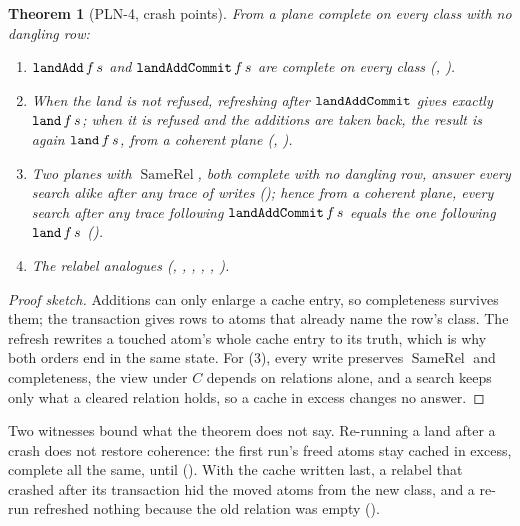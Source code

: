 \documentclass[11pt]{article}
\theoremstyle{plain}
\newtheorem{theorem}{Theorem}[section]
\theoremstyle{definition}
\theoremstyle{remark}
\newcommand{\mlean}[1]{\text{\texttt{#1}}}
\begin{document}
\begin{theorem}[PLN-4, crash points]\label{thm:crash}
From a plane complete on every class with no dangling row:
\begin{enumerate}
  \item $\mlean{landAdd}\,f\,s$ and $\mlean{landAddCommit}\,f\,s$ are complete on every class
  (, ).
  \item When the land is not refused, refreshing after $\mlean{landAddCommit}$ gives exactly
  $\mlean{land}\,f\,s$; when it is refused and the additions are taken back, the result is again
  $\mlean{land}\,f\,s$, from a coherent plane (,
  ).
  \item Two planes with $\operatorname{SameRel}$, both complete with no dangling row, answer
  every search alike after any trace of writes (); hence from a
  coherent plane, every search after any trace following $\mlean{landAddCommit}\,f\,s$ equals
  the one following $\mlean{land}\,f\,s$ ().
  \item The relabel analogues (, ,
  , ,
  , ).
\end{enumerate}
\end{theorem}

\begin{proof}[Proof sketch]
Additions can only enlarge a cache entry, so completeness survives them; the transaction gives
rows to atoms that already name the row's class. The refresh rewrites a touched atom's whole
cache entry to its truth, which is why both orders end in the same state. For (3), every write
preserves $\operatorname{SameRel}$ and completeness, the view under $C$ depends on relations
alone, and a search keeps only what a cleared relation holds, so a cache in excess changes no
answer.
\end{proof}

Two witnesses bound what the theorem does not say. Re-running a land after a crash does not
restore coherence: the first run's freed atoms stay cached in excess, complete all the same, until
 (). With the cache written last, a
relabel that crashed after its transaction hid the moved atoms from the new class, and a re-run
refreshed nothing because the old relation was empty
().
\end{document}

